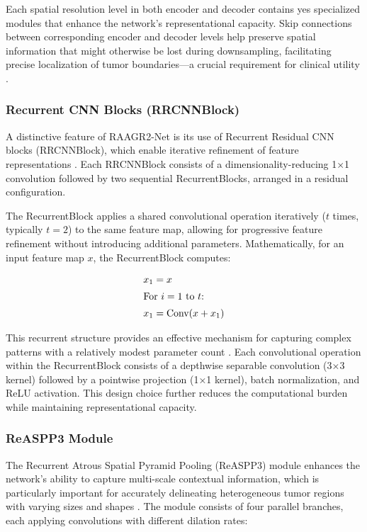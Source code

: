 \documentclass[12pt,a4paper]{article}
\begin{document}
Each spatial resolution level in both encoder and decoder contains yes specialized modules that enhance the network's representational capacity. Skip connections between corresponding encoder and decoder levels help preserve spatial information that might otherwise be lost during downsampling, facilitating precise localization of tumor boundaries—a crucial requirement for clinical utility \cite{Rehman2023RAAGR2}.

\subsubsection{Recurrent CNN Blocks (RRCNNBlock)}

A distinctive feature of RAAGR2-Net is its use of Recurrent Residual CNN blocks (RRCNNBlock), which enable iterative refinement of feature representations \cite{Rehman2023RAAGR2, Alom2019R2UNet}. Each RRCNNBlock consists of a dimensionality-reducing 1×1 convolution followed by two sequential RecurrentBlocks, arranged in a residual configuration.

The RecurrentBlock applies a shared convolutional operation iteratively ($t$ times, typically $t=2$) to the same feature map, allowing for progressive feature refinement without introducing additional parameters. Mathematically, for an input feature map $x$, the RecurrentBlock computes:

\begin{align}
x_1 &= x \\
\intertext{For $i = 1$ to $t$:}
x_1 &= \textrm{Conv}(x + x_1)
\end{align}

This recurrent structure provides an effective mechanism for capturing complex patterns with a relatively modest parameter count \cite{Alom2019R2UNet}. Each convolutional operation within the RecurrentBlock consists of a depthwise separable convolution (3×3 kernel) followed by a pointwise projection (1×1 kernel), batch normalization, and ReLU activation. This design choice further reduces the computational burden while maintaining representational capacity.

\subsubsection{ReASPP3 Module}

The Recurrent Atrous Spatial Pyramid Pooling (ReASPP3) module enhances the network's ability to capture multi-scale contextual information, which is particularly important for accurately delineating heterogeneous tumor regions with varying sizes and shapes \cite{Rehman2023RAAGR2}. The module consists of four parallel branches, each applying convolutions with different dilation rates:
\end{document}
